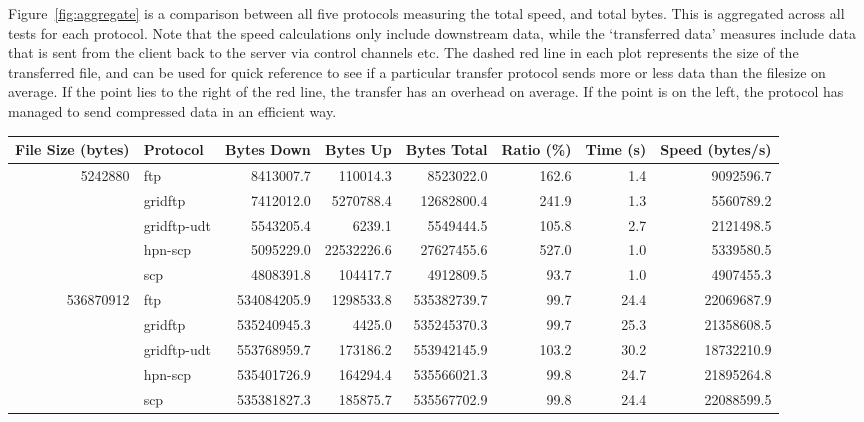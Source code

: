 \documentclass{sig-alternate-05-2015}
\begin{document}
Figure~\ref{fig:aggregate} is a comparison between all five protocols measuring the total speed, and total bytes. This is aggregated across all tests for each protocol. Note that the speed calculations only include downstream data, while the `transferred data' measures include data that is sent from the client back to the server via control channels etc. The dashed red line in each plot represents the size of the transferred file, and can be used for quick reference to see if a particular transfer protocol sends more or less data than the filesize on average. If the point lies to the right of the red line, the transfer has an overhead on average. If the point is on the left, the protocol has managed to send compressed data in an efficient way.

\begin{table}[t]
\centering
	\begin{tabular}{rlrrrrrr}
	\toprule
	File Size (bytes) &     Protocol &   Bytes Down &   Bytes Up &  Bytes Total &  Ratio (\%) &  Time (s) &  Speed (bytes/s) \\
	\midrule
	   5242880 &          ftp &    8413007.7 &   110014.3 &    8523022.0 &      162.6 &       1.4 &        9092596.7 \\
	           &      gridftp &    7412012.0 &  5270788.4 &   12682800.4 &      241.9 &       1.3 &        5560789.2 \\
	           &  gridftp-udt &    5543205.4 &     6239.1 &    5549444.5 &      105.8 &       2.7 &        2121498.5 \\
	           &      hpn-scp &    5095229.0 & 22532226.6 &   27627455.6 &      527.0 &       1.0 &        5339580.5 \\
	           &          scp &    4808391.8 &   104417.7 &    4912809.5 &       93.7 &       1.0 &        4907455.3 \\
	\midrule
	 536870912 &          ftp &  534084205.9 &  1298533.8 &  535382739.7 &       99.7 &      24.4 &       22069687.9 \\
	           &      gridftp &  535240945.3 &     4425.0 &  535245370.3 &       99.7 &      25.3 &       21358608.5 \\
	           &  gridftp-udt &  553768959.7 &   173186.2 &  553942145.9 &      103.2 &      30.2 &       18732210.9 \\
	           &      hpn-scp &  535401726.9 &   164294.4 &  535566021.3 &       99.8 &      24.7 &       21895264.8 \\
	           &          scp &  535381827.3 &   185875.7 &  535567702.9 &       99.8 &      24.4 &       22088599.5 \\

\end{tabular}
\end{table}
\end{document}
